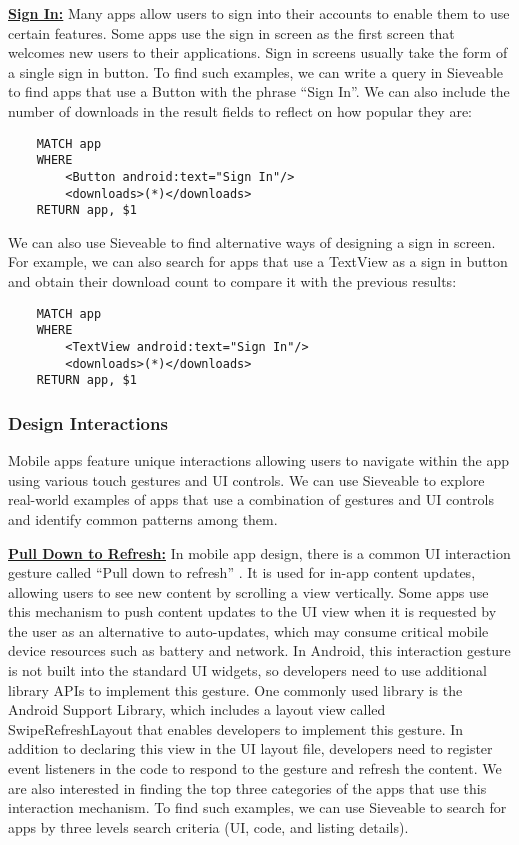 \underline{\textbf{Sign In:}}
Many apps allow users to sign into their accounts to enable them to use certain features.
Some apps use the sign in screen as the first screen that welcomes new users to their applications.
Sign in screens usually take the form of a single sign in button.
To find such examples, we can write a query in Sieveable to find apps that use a Button with the phrase ``Sign In''. 
We can also include the number of downloads in the result fields to reflect on how popular they are:
\begin{verbatim}
    MATCH app
    WHERE
        <Button android:text="Sign In"/>
        <downloads>(*)</downloads>
    RETURN app, $1
\end{verbatim}
We can also use Sieveable to find alternative ways of designing a sign in screen.
For example, we can also search for apps that use a TextView as a sign in button and obtain their download count to compare it with the previous results:
\begin{verbatim}
    MATCH app
    WHERE
        <TextView android:text="Sign In"/>
        <downloads>(*)</downloads>
    RETURN app, $1
\end{verbatim}

\subsubsection{Design Interactions}
Mobile apps feature unique interactions allowing users to navigate within the app using various touch gestures and UI controls. We can use Sieveable to explore real-world examples of apps that use a combination of gestures and UI controls and identify common patterns among them.
	
\underline{\textbf{Pull Down to Refresh:}}
In mobile app design, there is a common UI interaction gesture called ``Pull down to refresh'' \cite{brichter2010user}.
It is used for in-app content updates, allowing users to see new content by scrolling a view vertically.
Some apps use this mechanism to push content updates to the UI view when it is requested by the user as an alternative to auto-updates, which may consume critical mobile device resources such as battery and network.
In Android, this interaction gesture is not built into the standard UI widgets, so developers need to use additional library APIs to implement this gesture.
One commonly used library is the  Android Support Library, which includes a layout view called SwipeRefreshLayout that enables developers to implement this gesture.
In addition to declaring this view in the UI layout file, developers need to register event listeners in the code to respond to the gesture and refresh the content.
We are also interested in finding the top three categories of the apps that use this interaction mechanism.
To find such examples, we can use Sieveable to search for apps by three levels search criteria (UI, code, and listing details).

